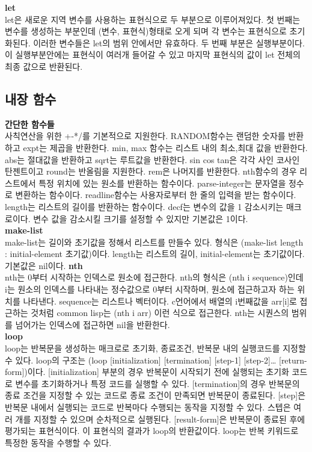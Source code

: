\documentclass{article}
\begin{document}
{\bf let}\\
let은 새로운 지역 변수를 사용하는 표현식으로 두 부분으로 이루어져있다. 첫 번째는 변수를 생성하는 부분인데 (변수, 표현식)형태로 오게 되며 각 변수는 표현식으로 초기화된다. 이러한 변수들은 let의 범위 안에서만 유효하다. 두 번째 부분은 실행부분이다. 이 실행부분안에는 표현식이 여러개 들어갈 수 있고 마지막 표현식의 값이 let 전체의 최종 값으로 반환된다. \\
\subsection{내장 함수}
{\bf 간단한 함수들}\\
사칙연산을 위한 +-*/를 기본적으로 지원한다. RANDOM함수는 랜덤한 숫자를 반환하고 expt는 제곱을 반환한다. min, max 함수는 리스트 내의 최소,최대 값을 반환한다. abs는 절대값을 반환하고 sqrt는 루트값을 반환한다. sin cos tan은 각각 사인 코사인 탄젠트이고 round는 반올림을 지원한다. rem은 나머지를 반환한다. nth함수의 경우 리스트에서 특정 위치에 있는 원소를 반환하는 함수이다. parse-integer는 문자열을 정수로 변환하는 함수이다. readline함수는 사용자로부터 한 줄의 입력을 받는 함수이다. length는 리스트의 길이를 반환하는 함수이다. decf는 변수의 값을 1 감소시키는 매크로이다. 변수 값을 감소시킬 크기를 설정할 수 있지만 기본값은 1이다.\\
{\bf make-list}\\
make-list는 길이와 초기값을 정해서 리스트를 만들수 있다. 형식은 (make-list length : initial-element 초기값)이다. length는 리스트의 길이, initial-element는 초기값이다. 기본값은 nil이다.
\newpage
{\bf nth}\\
nth는 0부터 시작하는 인덱스로 원소에 접근한다. nth의 형식은 (nth i sequence)인데 i는 원소의 인덱스를 나타내는 정수값으로 0부터 시작하며, 원소에 접근하고자 하는 위치를 나타낸다. sequence는 리스트나 벡터이다. c언어에서 배열의 i번째값을 arr[i]로 접근하는 것처럼 common lisp는 (nth i arr) 이런 식으로 접근한다. nth는 시퀀스의 범위를 넘어가는 인덱스에 접근하면 nil을 반환한다.
\\{\bf loop}\\
loop는 반복문을 생성하는 매크로로 초기화, 종료조건, 반복문 내의 실행코드를 지정할 수 있다. loop의 구조는 (loop [initialization] [termination] [step-1] [step-2]… [return-form])이다. [initialization] 부분의 경우 반복문이 시작되기 전에 실행되는 초기화 코드로 변수를 초기화하거나 특정 코드를 실행할 수 있다. [termination]의 경우 반복문의 종료 조건을 지정할 수 있는 코드로 종료 조건이 만족되면 반복문이 종료된다. [step]은 반복문 내에서 실행되는 코드로 반복마다 수행되는 동작을 지정할 수 있다. 스텝은 여러 개를 지정할 수 있으며 순차적으로 실행된다. [result-form]은 반복문이 종료된 후에 평가되는 표현식이다. 이 표현식의 결과가 loop의 반환값이다. loop는 반복 키워드로 특정한 동작을 수행할 수 있다. \\
\end{document}
